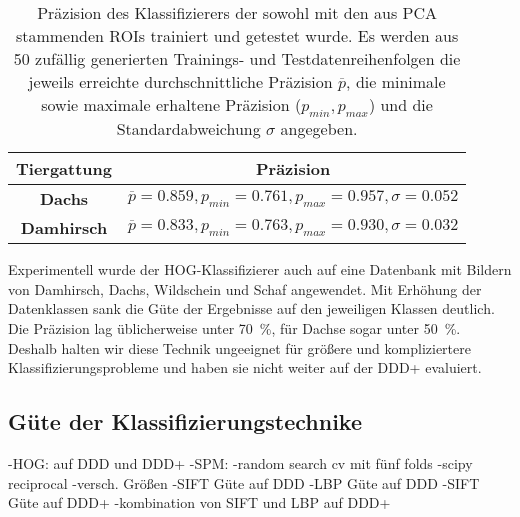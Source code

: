 \begin{table}[]
	\centering
	\caption{Präzision des Klassifizierers der sowohl mit den aus PCA stammenden ROIs trainiert und getestet wurde. Es werden aus 50 zufällig generierten Trainings- und Testdatenreihenfolgen die jeweils erreichte durchschnittliche Präzision $\overline{p}$, die minimale sowie maximale erhaltene Präzision ($p_{min}, p_{max}$) und die Standardabweichung $\sigma$ angegeben. }
	\label{tab:HOG:ResultsAuto}
	\begin{tabular}{cl}
		\hline
		\textbf{Tiergattung} 	       & \multicolumn{1}{c}{\textbf{Präzision}}                                                                                                                                                  \\ \hline
		\textbf{Dachs}                         &$\overline{p}= 0.859, p_{min}=0.761, p_{max}=0.957, \sigma=0.052$ \\
		\textbf{Damhirsch}                &$\overline{p}=0.833, p_{min}=0.763, p_{max}=0.930, \sigma=0.032$ \\
		\hline
	\end{tabular}
\end{table}

Experimentell wurde der HOG-Klassifizierer auch auf eine Datenbank mit Bildern von Damhirsch, Dachs, Wildschein und Schaf angewendet. Mit Erhöhung der Datenklassen sank die Güte der Ergebnisse auf den jeweiligen Klassen deutlich. Die Präzision lag üblicherweise unter 70~\%, für Dachse sogar unter 50~\%. Deshalb halten wir diese Technik ungeeignet für größere und kompliziertere Klassifizierungsprobleme und haben sie nicht weiter auf der DDD+ evaluiert.

\subsection{Güte der Klassifizierungstechnike}


-HOG: auf DDD und DDD+
-SPM:
	-random search cv mit fünf folds
	-scipy reciprocal
	-versch. Größen
	-SIFT Güte auf DDD
	-LBP Güte auf DDD
	-SIFT Güte auf DDD+
	-kombination von SIFT und LBP auf DDD+
